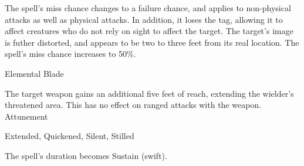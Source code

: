 The spell's miss chance changes to a failure chance, and applies to non-physical attacks as well as physical attacks.
In addition, it loses the  tag, allowing it to affect creatures who do not rely on sight to affect the target.
The target's image is futher distorted, and appears to be two to three feet from its real location.
The spell's miss chance increases to 50\%.
\begin{spellsection}{Elemental Blade}
\begin{spellheader}
\end{spellheader}
\begin{spellcontent}
\begin{spelltargetinginfo}
\end{spelltargetinginfo}
\begin{spelleffects}
\spelleffect
The target weapon gains an additional five feet of reach, extending the wielder's threatened area.
This has no effect on ranged attacks with the weapon.
\spelldur Attunement
\end{spelleffects}
\end{spellcontent}
\begin{spellfooter}
 Extended, Quickened, Silent, Stilled
\end{spellfooter}
\begin{spellsubcontent}
\begin{spellcantrip}
The spell's duration becomes Sustain (swift).
\end{spellcantrip}
\end{spellsubcontent}
\end{spellsection}
